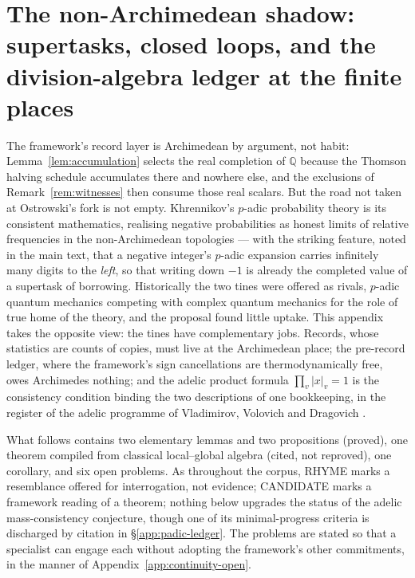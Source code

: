 \section{The non-Archimedean shadow: supertasks, closed loops, and the division-algebra ledger at the finite places}
\label{app:padic-shadow}

The framework's record layer is Archimedean by argument, not habit:
Lemma~\ref{lem:accumulation} selects the real completion of $\mathbb{Q}$ because the
Thomson halving schedule accumulates there and nowhere else, and the exclusions of
Remark~\ref{rem:witnesses} then consume those real scalars. But the road not taken at
Ostrowski's fork is not empty. Khrennikov's $p$-adic probability theory
\autocite{khrennikov1995} is its consistent mathematics, realising negative probabilities
as honest limits of relative frequencies in the non-Archimedean topologies --- with the
striking feature, noted in the main text, that a negative integer's $p$-adic expansion
carries infinitely many digits to the \emph{left}, so that writing down $-1$ is already
the completed value of a supertask of borrowing. Historically the two tines were offered
as rivals, $p$-adic quantum mechanics competing with complex quantum mechanics for the
role of true home of the theory, and the proposal found little uptake. This appendix
takes the opposite view: the tines have complementary jobs. Records, whose statistics
are counts of copies, must live at the Archimedean place; the pre-record ledger, where
the framework's sign cancellations are thermodynamically free, owes Archimedes nothing;
and the adelic product formula $\prod_v |x|_v = 1$ \autocite{ostrowski1916} is the
consistency condition binding the two descriptions of one bookkeeping, in the register
of the adelic programme of Vladimirov, Volovich and Dragovich
\autocite{vladimirovvolovich1989, dragovich1995}.

What follows contains two elementary lemmas and two propositions (proved), one theorem
compiled from classical local--global algebra (cited, not reproved), one corollary, and
six open problems. As throughout the corpus, RHYME marks a resemblance offered for
interrogation, not evidence; CANDIDATE marks a framework reading of a theorem; nothing
below upgrades the status of the adelic mass-consistency conjecture, though one of its
minimal-progress criteria is discharged by citation in \S\ref{app:padic-ledger}. The
problems are stated so that a specialist can engage each without adopting the
framework's other commitments, in the manner of
Appendix~\ref{app:continuity-open}.

